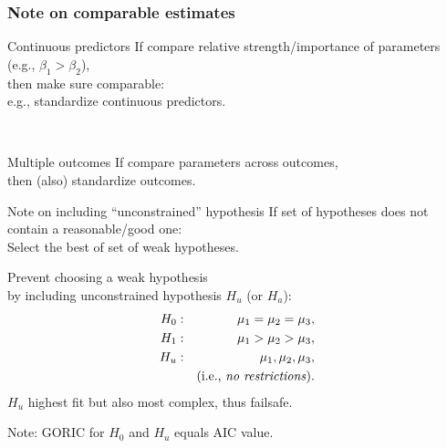 \documentclass[10pt]{beamer}\usepackage[]{graphicx}\usepackage[]{xcolor}
\begin{document}
%
\begin{frame}
	\frametitle{Note on comparable estimates}
	
	\begin{block}{Continuous predictors}
		If compare relative strength/importance of parameters (e.g., $\beta_1 > \beta_2$), \\ 
		then make sure comparable: \\
		e.g., standardize continuous predictors.
	\end{block}
	~\\
	
	\begin{block}{Multiple outcomes}
		If compare parameters across outcomes, \\ 
		then (also) standardize outcomes.
	\end{block}
	
\end{frame}
%
\begin{frame}{Note on including ``unconstrained'' hypothesis}%
If set of hypotheses does not contain a reasonable/good one:\\
Select the best of set of weak hypotheses.

\vspace{-0.5\baselineskip}
\begin{block}{}
Prevent choosing a weak hypothesis \\
by including unconstrained hypothesis $H_u$ (or $H_a$):
\begin{eqnarray}
\nonumber H_0: && \mu_1 = \mu_2 = \mu_3,\\
\nonumber H_1: && \mu_1 > \mu_2 > \mu_3,\\
\nonumber H_u: && \mu_1, \mu_2, \mu_3, \\
\nonumber && \mbox{(i.e., \textit{no restrictions})}.
\end{eqnarray}
$H_u$ highest fit but also most complex, thus failsafe.
\end{block}

\vspace{0.5\baselineskip}
Note: GORIC for $H_0$ and $H_u$ equals AIC value.	
\end{frame}
\end{document}
